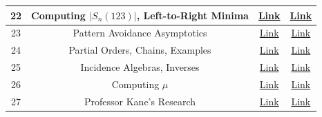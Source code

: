 \documentclass[letterpaper]{article}
\begin{document}
\begin{center}
\begin{tabular}{|c|c|c|c|}
        \hline
        22 & Computing $|S_{n}(123)|$, Left-to-Right Minima & \href{http://cseweb.ucsd.edu/~dakane/Math184/Lec22.html}{Link} & \href{http://cseweb.ucsd.edu/~dakane/Math184/Lec22.pdf}{Link} \\ 
        \hline
        23 & Pattern Avoidance Asymptotics & \href{http://cseweb.ucsd.edu/~dakane/Math184/Lec23.html}{Link} & \href{http://cseweb.ucsd.edu/~dakane/Math184/Lec23.pdf}{Link} \\
        \hline 
        24 & Partial Orders, Chains, Examples & \href{http://cseweb.ucsd.edu/~dakane/Math184/Lec24.html}{Link} & \href{http://cseweb.ucsd.edu/~dakane/Math184/Lec24.pdf}{Link} \\ 
        \hline
        25 & Incidence Algebras, Inverses & \href{http://cseweb.ucsd.edu/~dakane/Math184/Lec25.html}{Link} & \href{http://cseweb.ucsd.edu/~dakane/Math184/Lec25.pdf}{Link} \\
        \hline 
        26 & Computing $\mu$ & \href{http://cseweb.ucsd.edu/~dakane/Math184/Lec26.html}{Link} & \href{http://cseweb.ucsd.edu/~dakane/Math184/Lec26.pdf}{Link} \\ 
        \hline
        27 & Professor Kane's Research & \href{http://cseweb.ucsd.edu/~dakane/Math184/Lec27.html}{Link} & \href{http://cseweb.ucsd.edu/~dakane/Math184/Lec27.pdf}{Link} \\ 
        \hline 
    \end{tabular}
\end{center}
\end{document}
